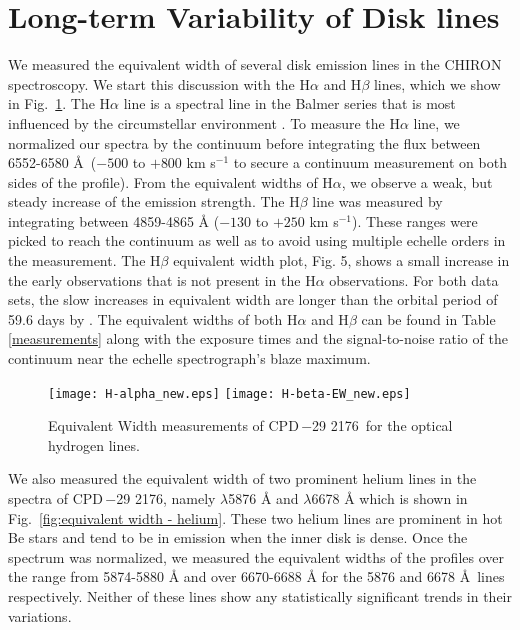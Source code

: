 \documentclass[]{aastex631}
\newcommand{\target}{CPD\,$-$29 2176}
\begin{document}
\section{Long-term Variability of Disk lines}

We measured the equivalent width of several disk emission lines in the CHIRON spectroscopy. We start this discussion with the H$\alpha$ and H$\beta$ lines, which we show in Fig.~\ref{fig:equivalent width - hydrogen}. The H$\alpha$ line is a spectral line in the Balmer series that is most influenced by the circumstellar environment \citep[e.g.,][]{B}. To measure the H$\alpha$ line, we normalized our spectra by the continuum before integrating the flux 
between 6552-6580 \AA\ ($-500$ to $+800$ km s$^{-1}$ to 
secure a continuum measurement on both sides of the profile).
From the equivalent widths of H$\alpha$, we observe a weak, but steady increase of the emission strength. The H$\beta$ line was measured by integrating between 4859-4865 {\AA} ($-130$ to $+250$ km s$^{-1}$). These ranges were picked to reach the continuum as well as to avoid using multiple echelle orders in the measurement. 
The H$\beta$ equivalent width plot, Fig. 5, shows a small increase
in the early observations that is not present in the H$\alpha$ observations. For both data sets, the slow increases in equivalent width are longer than the orbital period of 59.6 days by \citet{noel}. The equivalent widths of both H$\alpha$ and H$\beta$ can be found in Table \ref{measurements} along with the exposure times and the signal-to-noise ratio of the continuum near the echelle spectrograph's blaze maximum.

\begin{figure}
    \centering
    \texttt{[image: H-alpha\_new.eps]}
    \texttt{[image: H-beta-EW\_new.eps]}
    \caption{Equivalent Width measurements of \target\ for the optical hydrogen lines.}
    \label{fig:equivalent width - hydrogen}
\end{figure}



We also measured the equivalent width of two prominent helium lines in the spectra of \target, namely   ${\lambda}$5876 {\AA} and   ${\lambda}$6678 {\AA} which is shown in Fig.~\ref{fig:equivalent width - helium}. These two helium lines are prominent in hot Be stars and tend to be in emission when the inner disk is dense. Once the spectrum was normalized, we measured the equivalent widths of the profiles over the range from 5874-5880 {\AA} and over 6670-6688 {\AA} for the 5876 and 6678 \AA\ lines respectively. Neither of these lines show any statistically significant trends in their variations.
\end{document}
